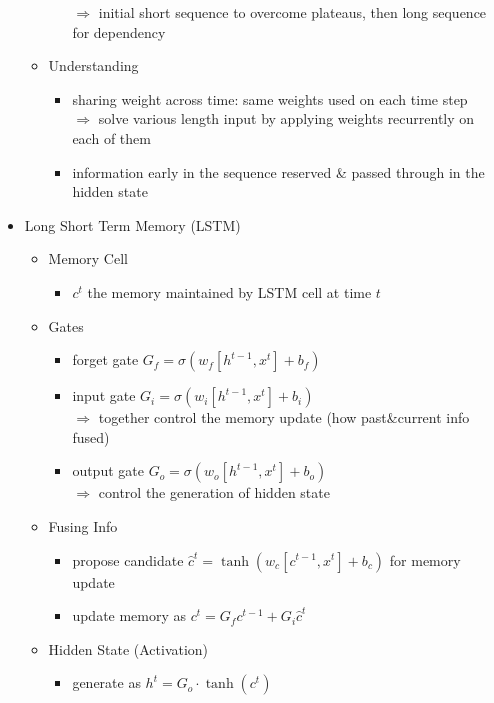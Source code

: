 \begin{itemize}
\begin{itemize}
\begin{itemize}
		$\Rightarrow$ initial short sequence to overcome plateaus, then long sequence for dependency
		\end{itemize}
	\item Understanding
		\begin{itemize}
		\item sharing weight across time: same weights used on each time step \\
		$\Rightarrow$ solve various length input by applying weights recurrently on each of them
		\item information early in the sequence reserved \& passed through in the hidden state
		\end{itemize}
	\end{itemize}

\item Long Short Term Memory (LSTM)
	\begin{itemize}
	\item Memory Cell
		\begin{itemize}
		\item $c^t$ the memory maintained by LSTM cell at time $t$
		\end{itemize}
	\item Gates
		\begin{itemize}
		\item forget gate $G_f=\sigma(w_f[h^{t-1}, x^t] + b_f)$
		\item input gate $G_i = \sigma(w_i[h^{t-1}, x^t] + b_i)$ \\
		$\Rightarrow$ together control the memory update (how past\&current info fused)
		\item output gate $G_o = \sigma(w_o[h^{t-1}, x^{t}] + b_o)$ \\
		$\Rightarrow$ control the generation of hidden state
		\end{itemize}
	\item Fusing Info
		\begin{itemize}
		\item propose candidate $\hat{c}^{t}=\tanh(w_c[c^{t-1}, x^{t}]+b_c)$ for memory update
		\item update memory as $c^t = G_f c^{t-1} + G_i \hat c^t$
		\end{itemize}
	\item Hidden State (Activation)
		\begin{itemize}
		\item generate as $h^t = G_o \cdot \tanh(c^t)$
		\end{itemize}
	\begin{minipage}[r]{0.5\linewidth}

\end{minipage}
\end{itemize}
\end{itemize}
